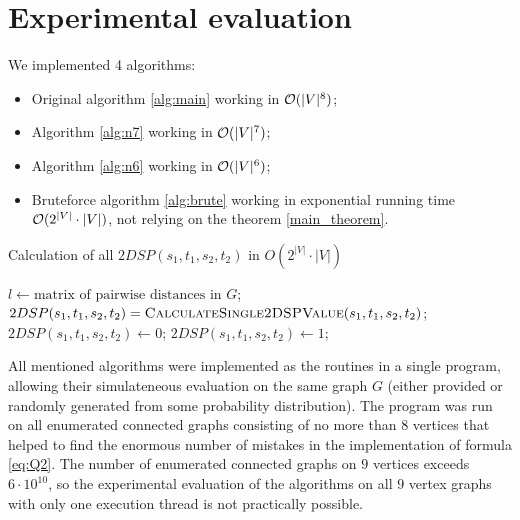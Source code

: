 \section{Experimental evaluation}

We implemented 4 algorithms:

\begin{itemize}
\item Original algorithm \ref{alg:main} working in $\mathcal{O}(|V|^8)$;
\item Algorithm \ref{alg:n7} working in $\mathcal{O}(|V|^7)$;
\item Algorithm \ref{alg:n6} working in $\mathcal{O}(|V|^6)$;
\item Bruteforce algorithm \ref{alg:brute} working in exponential running time $\mathcal{O}(2^{|V|} \cdot |V|)$, not relying on the theorem \ref{main_theorem}.
\end{itemize}

\begin{algorithm}
\caption{Calculation of all $2DSP(s_1, t_1, s_2, t_2)$ in $O(2^{|V|} \cdot |V|)$} \label{alg:brute}
\begin{algorithmic}[1]
\State $l \gets \text{matrix of pairwise distances in }G$;
    \State $2DSP(s_1, t_1, s_2, t_2) = \textsc{CalculateSingle2DSPValue}(s_1, t_1, s_2, t_2)$;
\EndFor
\EndProcedure
\Statex
{}
\State $2DSP(s_1, t_1, s_2, t_2) \gets 0$;
        \State $2DSP(s_1, t_1, s_2, t_2) \gets 1$;
    \EndIf
\EndFor
\EndProcedure
\end{algorithmic}
\end{algorithm}

All mentioned algorithms were implemented as the routines in a single program, allowing their simulateneous evaluation on the same graph $G$ (either provided or randomly generated from some probability distribution). The program was run on all enumerated connected graphs consisting of no more than $8$ vertices that helped to find the enormous number of mistakes in the implementation of formula \eqref{eq:Q2}. The number of enumerated connected graphs on $9$ vertices exceeds $6 \cdot 10^{10}$, so the experimental evaluation of the algorithms on all $9$ vertex graphs with only one execution thread is not practically possible. 

